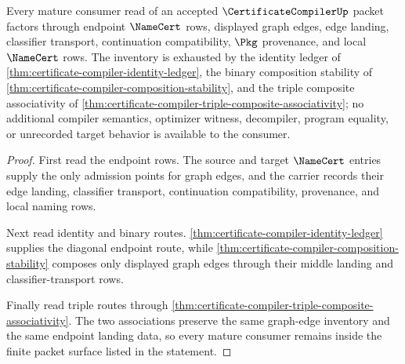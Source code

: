 \begin{theorem}
\label{thm:certificate-compiler-mature-consumer-inventory}
Every mature consumer read of an accepted $\CertificateCompilerUp$ packet factors through endpoint $\NameCert$ rows, displayed graph edges, edge landing, classifier transport, continuation compatibility, $\Pkg$ provenance, and local $\NameCert$ rows. The inventory is exhausted by the identity ledger of \autoref{thm:certificate-compiler-identity-ledger}, the binary composition stability of \autoref{thm:certificate-compiler-composition-stability}, and the triple composite associativity of \autoref{thm:certificate-compiler-triple-composite-associativity}; no additional compiler semantics, optimizer witness, decompiler, program equality, or unrecorded target behavior is available to the consumer.
\end{theorem}
\begin{proof}
First read the endpoint rows. The source and target $\NameCert$ entries supply the only admission points for graph edges, and the carrier records their edge landing, classifier transport, continuation compatibility, provenance, and local naming rows.

Next read identity and binary routes. \autoref{thm:certificate-compiler-identity-ledger} supplies the diagonal endpoint route, while \autoref{thm:certificate-compiler-composition-stability} composes only displayed graph edges through their middle landing and classifier-transport rows.

Finally read triple routes through \autoref{thm:certificate-compiler-triple-composite-associativity}. The two associations preserve the same graph-edge inventory and the same endpoint landing data, so every mature consumer remains inside the finite packet surface listed in the statement.
\end{proof}

